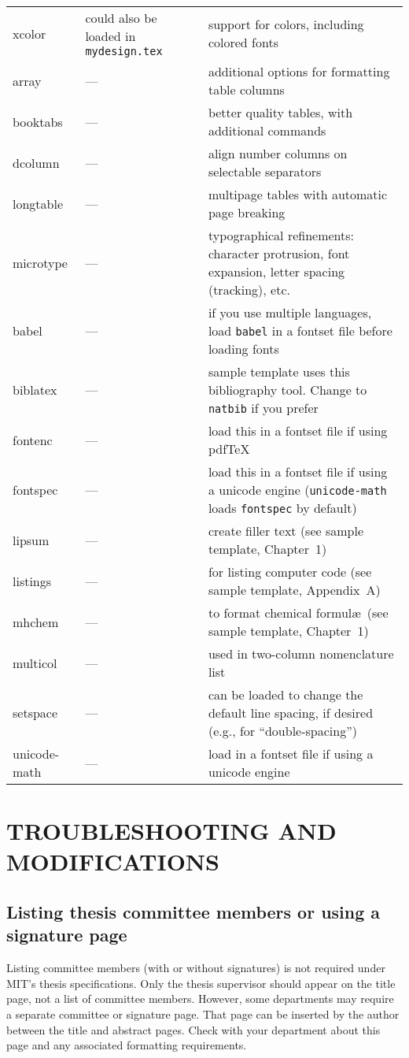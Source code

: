 \documentclass[11pt]{article}
\newcommand*\pdfTeX{pdf\TeX}
\begin{document}
\begin{table}
{\begin{tabular*}{\textwidth}{>{\ttfamily}l<{}@{\extracolsep{\fill}}p{18em} p{22em} }
xcolor	   & could also be loaded in \texttt{mydesign.tex} 		& support for colors, including colored fonts \\[0.7em]
array	   & --- & additional options for formatting table columns \\
booktabs   & --- & better quality tables, with additional commands \\
dcolumn    & --- & align number columns on selectable separators \\
longtable  & --- & multipage tables with automatic page breaking \\
microtype  & --- & typographical refinements: character protrusion, font expansion, letter spacing (tracking), etc. \\
\midrule
babel	 & --- & if you use multiple languages, load \texttt{babel} in a fontset file before loading fonts \\
biblatex & --- & sample template uses this bibliography tool. Change to \texttt{natbib} if you prefer\\
fontenc	 & --- & load this in a fontset file if using \pdfTeX\\
fontspec & --- & load this in a fontset file if using a unicode engine (\texttt{unicode-math} loads \texttt{fontspec} by default)\\
lipsum   & --- & create filler text (see sample template, Chapter~1) \\
listings & --- & for listing computer code (see sample template, Appendix~A) \\
mhchem   & --- & to format chemical formul\ae\ (see sample template, Chapter~1) \\
multicol & --- & used in two-column nomenclature list \\
setspace & --- & can be loaded to change the default line spacing, if desired (e.g., for ``double-spacing'')\\
unicode-math & --- & load in a fontset file if using a unicode engine\\
\bottomrule
\end{tabular*}}%
\end{table}

\section{TROUBLESHOOTING AND MODIFICATIONS}

\subsection{Listing thesis committee members or using a signature page}
Listing committee members (with or without signatures) is not required under MIT's thesis specifications. Only the thesis supervisor should appear on the title page, not a list of committee members.  However, some departments may require a separate committee or signature page.  That page can be inserted by the author between the title and abstract pages.  Check with your department about this page and any associated formatting requirements. 
\end{document}
